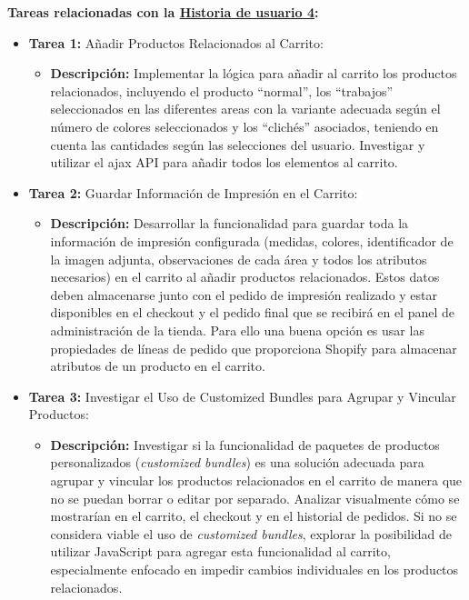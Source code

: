 \documentclass[12pt]{article}
\begin{document}
\textbf{Tareas relacionadas con la \hyperref[sec:historia4]{Historia de usuario 4}:}
\begin{itemize}
    \item \textbf{Tarea 1:} Añadir Productos Relacionados al Carrito:
          \begin{itemize}[label=--]
              \item \textbf{Descripción:} Implementar la lógica para añadir al carrito los productos relacionados, incluyendo el producto ``normal'', los ``trabajos'' seleccionados en las diferentes areas con la variante adecuada según el número de colores seleccionados y los ``clichés'' asociados, teniendo en cuenta las cantidades según las selecciones del usuario. Investigar y utilizar el ajax API para añadir todos los elementos al carrito.
          \end{itemize}
    \item \textbf{Tarea 2:} Guardar Información de Impresión en el Carrito:
          \begin{itemize}[label=--]
              \item \textbf{Descripción:} Desarrollar la funcionalidad para guardar toda la información de impresión configurada (medidas, colores, identificador de la imagen adjunta, observaciones de cada área y todos los atributos necesarios) en el carrito al añadir productos relacionados. Estos datos deben almacenarse junto con el pedido de impresión realizado y estar disponibles en el checkout y el pedido final que se recibirá en el panel de administración de la tienda. Para ello una buena opción es usar las propiedades de líneas de pedido \cite{properties-lineitem} que proporciona Shopify para almacenar atributos de un producto en el carrito.
          \end{itemize}
    \item \textbf{Tarea 3:} Investigar el Uso de Customized Bundles para Agrupar y Vincular Productos:
          \begin{itemize}[label=--]
              \item \textbf{Descripción:} Investigar si la funcionalidad de paquetes de productos personalizados (\textit{customized bundles}) es una solución adecuada para agrupar y vincular los productos relacionados en el carrito de manera que no se puedan borrar o editar por separado. Analizar visualmente cómo se mostrarían en el carrito, el checkout y en el historial de pedidos. Si no se considera viable el uso de \textit{customized bundles}, explorar la posibilidad de utilizar JavaScript para agregar esta funcionalidad al carrito, especialmente enfocado en impedir cambios individuales en los productos relacionados.
          \end{itemize} 
\end{itemize}
\end{document}
